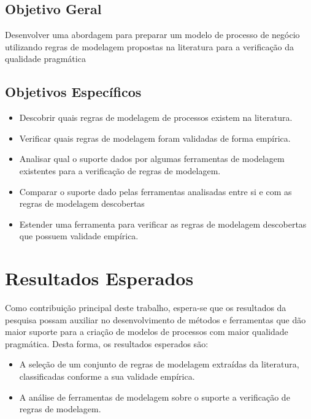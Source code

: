 \documentclass[12pt]{article}
\begin{document}
\subsection{Objetivo Geral}


Desenvolver uma abordagem para preparar um modelo de processo de negócio utilizando regras de modelagem propostas na literatura para a verificação da qualidade pragmática

\subsection{Objetivos Específicos}
\begin{itemize}
	\item Descobrir quais regras de modelagem de processos existem na literatura.
	\item Verificar quais regras de modelagem foram validadas de forma empírica.
	\item Analisar qual o suporte dados por algumas ferramentas de modelagem existentes para a verificação de regras de modelagem.
	\item Comparar o suporte dado pelas ferramentas analisadas entre si e com as regras de modelagem descobertas
	\item Estender uma ferramenta para verificar as regras de modelagem descobertas que possuem validade empírica.
\end{itemize}

\newpage
\section{Resultados Esperados}

Como contribuição principal deste trabalho, espera-se que os resultados da pesquisa possam auxiliar no desenvolvimento de métodos e ferramentas que dão maior suporte para a criação de modelos de processos com maior qualidade pragmática. Desta forma, os resultados esperados são:

\begin{itemize}
	\item A seleção de um conjunto de regras de modelagem extraídas da literatura, classificadas conforme a sua validade empírica.
	\item A análise de ferramentas de modelagem sobre o suporte a verificação de regras de modelagem.
\end{itemize}
\end{document}

